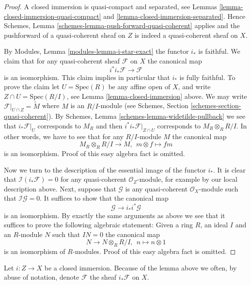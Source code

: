 \begin{proof}
A closed immersion is quasi-compact and separated, see
Lemmas \ref{lemma-closed-immersion-quasi-compact} and
\ref{lemma-closed-immersion-separated}. Hence
Schemes, Lemma \ref{schemes-lemma-push-forward-quasi-coherent}
applies and the pushforward of a quasi-coherent
sheaf on $Z$ is indeed a quasi-coherent sheaf on $X$.

\medskip\noindent
By Modules, Lemma \ref{modules-lemma-i-star-exact}
the functor $i_*$ is faithful. We claim that
for any quasi-coherent sheaf $\mathcal{F}$ on $X$
the canonical map
$$
i^*i_*\mathcal{F} \longrightarrow \mathcal{F}
$$
is an isomorphism. This claim implies in particular that $i_*$ is
fully faithful. To prove the claim let $U = \text{Spec}(R)$ be any affine open
of $X$, and write $Z \cap U = \text{Spec}(R/I)$, see
Lemma \ref{lemma-closed-immersion} above. We may write
$\mathcal{F}|_{U \cap Z} = \widetilde{M}$ where
$M$ is an $R/I$-module (see
Schemes, Section \ref{schemes-section-quasi-coherent}).
By Schemes, Lemma \ref{schemes-lemma-widetilde-pullback}
we see that $i_*\mathcal{F}|_U$ corresponds to
$M_R$ and then $i^*i_*\mathcal{F}|_{Z \cap U}$ corresponds
to $M_R \otimes_R R/I$. In other words, we have to see that
for any $R/I$-module $M$ the canonical map
$$
M_R \otimes_R R/I \longrightarrow M, \ \ 
m \otimes f \longmapsto fm
$$
is an isomorphism. Proof of this easy algebra fact is omitted.

\medskip\noindent
Now we turn to the description of the essential image of the
functor $i_*$. It is clear that $\mathcal{I}(i_*\mathcal{F}) = 0$
for any quasi-coherent $\mathcal{O}_Z$-module, for example
by our local description above. Next, suppose that $\mathcal{G}$
is any quasi-coherent $\mathcal{O}_X$-module such that
$\mathcal{I}\mathcal{G} = 0$. It suffices to show that the canonical map
$$
\mathcal{G} \longrightarrow i_* i^*\mathcal{G}
$$
is an isomorphism. By exactly the same arguments as above we see that
it suffices to prove the following algebraic statement: Given a ring
$R$, an ideal $I$ and an $R$-module $N$ such that $IN = 0$ the canonical map
$$
N \longrightarrow N \otimes_R R/I, \ \ 
n \longmapsto n \otimes 1
$$
is an isomorphism of $R$-modules. Proof of this easy algebra fact is omitted.
\end{proof}

\noindent
Let $i : Z \to X$ be a closed immersion. Because of the lemma above we often,
by abuse of notation, denote $\mathcal{F}$ the sheaf $i_*\mathcal{F}$ on $X$.

